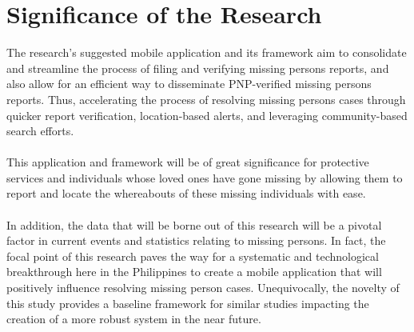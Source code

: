\section{Significance of the Research}
\label{sec:significance}
The research’s suggested mobile application and its framework aim to consolidate and streamline the process of filing and verifying missing persons reports, and also allow for an efficient way to disseminate PNP-verified missing persons reports. Thus, accelerating the process of resolving missing persons cases through quicker report verification, location-based alerts, and leveraging community-based search efforts. 
\\\\This application and framework will be of great significance for protective services and individuals whose loved ones have gone missing by allowing them to report and locate the whereabouts of these missing individuals with ease.
\\\\In addition, the data that will be borne out of this research will be a pivotal factor in current events and statistics relating to missing persons. In fact, the focal point of this research paves the way for a systematic and technological breakthrough here in the Philippines to create a mobile application that will positively influence resolving missing person cases. Unequivocally, the novelty of this study provides a baseline framework for similar studies impacting the creation of a more robust system in the near future.


